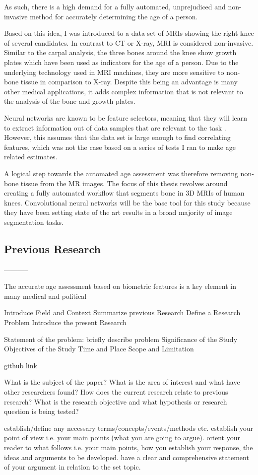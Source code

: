 As such, there is a high demand for a fully automated, unprejudiced and non-invasive method for accurately determining the age of a person.

Based on this idea, I was introduced to a data set of MRIs showing the right knee of several candidates. In contrast to CT or X-ray, MRI is considered non-invasive. Similar to the carpal analysis, the three bones around the knee show growth plates which have been used as indicators for the age of a person. Due to the underlying technology used in MRI machines, they are more sensitive to non-bone tissue in comparison to X-ray. Despite this being an advantage is many other medical applications, it adds complex information that is not relevant to the analysis of the bone and growth plates.

Neural networks are known to be feature selectors, meaning that they will learn to extract information out of data samples that are relevant to the task \cite{Setiono1997}. However, this assumes that the data set is large enough to find correlating features, which was not the case based on a series of tests I ran to make age related estimates.

A logical step towards the automated age assessment was therefore removing non-bone tissue from the MR images. The focus of this thesis revolves around creating a fully automated workflow that segments bone in 3D MRIs of human knees. Convolutional neural networks will be the base tool for this study because they have been setting state of the art results in a broad majority of image segmentation tasks.

\subsection{Previous Research}

-----------

The accurate age assessment based on biometric features is a key element in many medical and political

Introduce Field and Context
Summarize previous Research
Define a Research Problem
Introduce the present Research

Statement of the problem: briefly describe problem
Significance of the Study
Objectives of the Study
Time and Place
Scope and Limitation

github link

What is the subject of the paper?
What is the area of interest and what have other researchers found?
How does the current research relate to previous research?
What is the research objective and what hypothesis or research question is being tested?

establish/define any necessary terms/concepts/events/methods etc.
establish your point of view i.e. your main points (what you are going to argue).
orient your reader to what follows i.e. your main points, how you establish your response, the ideas and arguments to be developed.
have a clear and comprehensive statement of your argument in relation to the set topic.

\newpage
